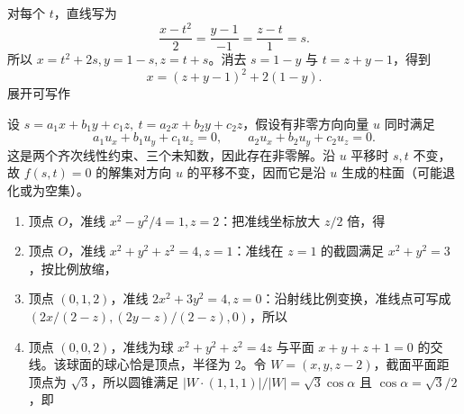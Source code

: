 对每个 $t$，直线写为
\[\frac{x-t^2}{2}=\frac{y-1}{-1}=\frac{z-t}{1}=s.
\]
所以 $x=t^2+2s,y=1-s,z=t+s$。消去 $s=1-y$ 与 $t=z+y-1$，得到
\[x=(z+y-1)^2+2(1-y).\]
展开可写作

设 $s=a_1x+b_1y+c_1z,\ t=a_2x+b_2y+c_2z$，假设有非零方向向量 $u$ 同时满足
\[a_1u_x+b_1u_y+c_1u_z=0,\qquad a_2u_x+b_2u_y+c_2u_z=0.\]
这是两个齐次线性约束、三个未知数，因此存在非零解。沿 $u$ 平移时 $s,t$ 不变，故 $f(s,t)=0$ 的解集对方向 $u$ 的平移不变，因而它是沿 $u$ 生成的柱面（可能退化或为空集）。

\begin{enumerate}[label=(\arabic*)]
\item 顶点 $O$，准线 $x^2-y^2/4=1,z=2$：把准线坐标放大 $z/2$ 倍，得
\item 顶点 $O$，准线 $x^2+y^2+z^2=4,z=1$：准线在 $z=1$ 的截圆满足 $x^2+y^2=3$，按比例放缩，
\item 顶点 $(0,1,2)$，准线 $2x^2+3y^2=4,z=0$：沿射线比例变换，准线点可写成 $(2x/(2-z),(2y-z)/(2-z),0)$，所以
\item 顶点 $(0,0,2)$，准线为球 $x^2+y^2+z^2=4z$ 与平面 $x+y+z+1=0$ 的交线。该球面的球心恰是顶点，半径为 $2$。令 $W=(x,y,z-2)$，截面平面距顶点为 $\sqrt3$，所以圆锥满足 $|W\cdot(1,1,1)|/|W|=\sqrt3\cos\alpha$ 且 $\cos\alpha=\sqrt3/2$，即
\end{enumerate}
